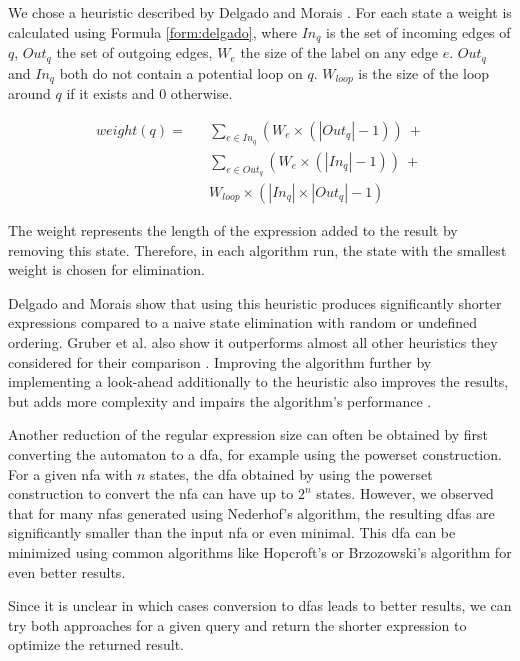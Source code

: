 We chose a heuristic described by Delgado and Morais \cite{delgado}.
For each state a weight is calculated using Formula \ref{form:delgado}, where $In_q$ is the set of incoming edges of $q$, $Out_q$ the set of outgoing edges, $W_e$ the size of the label on any edge $e$. $Out_q$ and $In_q$ both do not contain a potential loop on $q$. $W_{loop}$ is the size of the loop around $q$ if it exists and $0$ otherwise. 

\begin{equation}
	\begin{aligned}
	weight(q) = &&\sum_{e \in In_q} (W_{e} \times (|Out_q| - 1))\ + \\&&\sum_{e \in Out_q} (W_{e} \times (|In_q| - 1))\ + \\&&W_{loop} \times (|In_q| \times |Out_q| - 1)
	\end{aligned}
\label{form:delgado}
\end{equation}

The weight represents the length of the expression added to the result by removing this state.
Therefore, in each algorithm run, the state with the smallest weight is chosen for elimination.

Delgado and Morais show that using this heuristic produces significantly shorter expressions compared to a naive state elimination \cite{delgado} with random or undefined ordering. Gruber et al. also show it outperforms almost all other heuristics they considered for their comparison \cite{gruber}.
Improving the algorithm further by implementing a look-ahead additionally to the heuristic also improves the results, but adds more complexity and impairs the algorithm's performance \cite{delgado}.

Another reduction of the regular expression size can often be obtained by first converting the automaton to a \ac{dfa}, for example using the powerset construction. For a given \ac{nfa} with $n$ states, the \ac{dfa} obtained by using the powerset construction to convert the \ac{nfa} can have up to $2^n$ states. However, we observed that for many \acp{nfa} generated using Nederhof's algorithm, the resulting \acp{dfa} are significantly smaller than the input \ac{nfa} or even minimal. This \ac{dfa} can be minimized using common algorithms like Hopcroft's or Brzozowski's algorithm for even better results.

Since it is unclear in which cases conversion to \acp{dfa} leads to better results, we can try both approaches for a given query and return the shorter expression to optimize the returned result.


